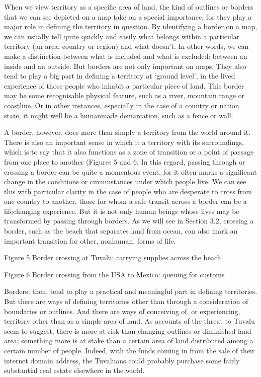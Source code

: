 \documentclass[letterpaper,10pt,english]{sphinxmanual}
\let\sphinxpxdimen\pdfpxdimen\else\newdimen\sphinxpxdimen
\begin{document}
When we view territory as a specific area of land, the kind of outlines or borders that we can see depicted on a map take on a special importance, for they play a major role in defining the territory in question. By identifying a border on a map, we can usually tell quite quickly and easily what belongs within a particular territory (an area, country or region) and what doesn’t. In other words, we can make a distinction between what is included and what is excluded: between an inside and an
outside. But borders are not only important on maps. They also tend to play a big part in defining a territory at ‘ground level’, in the lived experience of those people who inhabit a particular piece of land. This border may be some recognisable physical feature, such as a river, mountain range or coastline. Or in other instances, especially in the case of a country or nation state, it might well be a human\sphinxhyphen{}made demarcation, such as a fence or wall.

A border, however, does more than simply  a territory from the world around it. There is also an important sense in which it  a territory with its surroundings, which is to say that it also functions as a zone of transition or a point of passage from one place to another (Figures 5 and 6. In this regard, passing through or crossing a border can be quite a momentous event, for it often marks a significant change in the conditions or circumstances under which people live. We can
see this with particular clarity in the case of people who are desperate to cross from one country to another, those for whom a safe transit across a border can be a life\sphinxhyphen{}changing experience. But it is not only human beings whose lives may be transformed by passing through borders. As we will see in Section 3.2, crossing a border, such as the beach that separates land from ocean, can also mark an important transition for other, non\sphinxhyphen{}human, forms of life.

\sphinxincludegraphics[width=444\sphinxpxdimen,height=367\sphinxpxdimen]{{dd205_3_005i}.jpg}

Figure 5 Border crossing at Tuvalu: carrying supplies across the beach

\sphinxincludegraphics[width=445\sphinxpxdimen,height=308\sphinxpxdimen]{{dd205_3_006i}.jpg}

Figure 6 Border crossing from the USA to Mexico: queuing for customs

Borders, then, tend to play a practical and meaningful part in defining territories. But there are ways of defining territories other than through a consideration of boundaries or outlines. And there are ways of conceiving of, or experiencing, territory other than as a simple area of land. As accounts of the threat to Tuvalu seem to suggest, there is more at risk than changing outlines or diminished land area; something more is at stake than a certain area of land distributed among a certain
number of people. Indeed, with the funds coming in from the sale of their internet domain address, the Tuvaluans could probably purchase some fairly substantial real estate elsewhere in the world.
\end{document}
